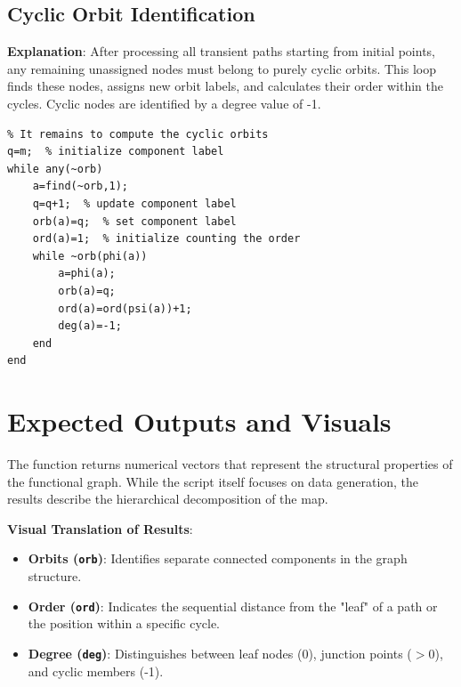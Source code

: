 \subsection{Cyclic Orbit Identification}
\textbf{Explanation}: After processing all transient paths starting from initial points, any remaining unassigned nodes must belong to purely cyclic orbits. This loop finds these nodes, assigns new orbit labels, and calculates their order within the cycles. Cyclic nodes are identified by a degree value of -1.

\begin{lstlisting}
% It remains to compute the cyclic orbits
q=m;  % initialize component label
while any(~orb)
    a=find(~orb,1);
    q=q+1;  % update component label
    orb(a)=q;  % set component label
    ord(a)=1;  % initialize counting the order
    while ~orb(phi(a))
        a=phi(a);
        orb(a)=q;
        ord(a)=ord(psi(a))+1;
        deg(a)=-1;
    end
end
\end{lstlisting}

\section{Expected Outputs and Visuals}

The function returns numerical vectors that represent the structural properties of the functional graph. While the script itself focuses on data generation, the results describe the hierarchical decomposition of the map.



\textbf{Visual Translation of Results}:
\begin{itemize}
    \item \textbf{Orbits (\texttt{orb})}: Identifies separate connected components in the graph structure.
    \item \textbf{Order (\texttt{ord})}: Indicates the sequential distance from the "leaf" of a path or the position within a specific cycle.
    \item \textbf{Degree (\texttt{deg})}: Distinguishes between leaf nodes (0), junction points ($>0$), and cyclic members (-1).
\end{itemize}


